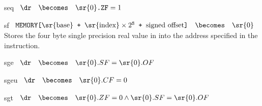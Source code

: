 \begin{instruction}{seq}
     {\seqopc}
     {
       \begin{math}
         \begin{array}{lcl}
           \dr & \becomes & \sr{0}\texttt{.ZF} = 1 \\
         \end{array}
       \end{math}
     }
\end{instruction}


\begin{instruction}{sf}
     {\sfopc}
     {
       \begin{math}
         \begin{array}{lcl}
           \texttt{MEMORY[\textrm{\sr{base}} + \(\textrm{\sr{index}}
               \times 2^\texttt{S}\) +  \textrm{signed offset}]}
           & \becomes & {\sr{0}}
         \end{array}
       \end{math}
     }
     {
       Stores the four byte single precision real value
       in  into the address specified in the instruction.
     }
\end{instruction}


\begin{instruction}{sge}
     {\sgeopc}
     {
       \begin{math}
         \begin{array}{lcl}
           \dr & \becomes & \sr{0}.SF = \sr{0}.OF \\
         \end{array}
       \end{math}
     }
\end{instruction}


\begin{instruction}{sgeu}
     {\sgeuopc}
     {
       \begin{math}
         \begin{array}{lcl}
           \dr & \becomes & \sr{0}.CF = 0 \\
         \end{array}
       \end{math}
     }
\end{instruction}


\begin{instruction}{sgt}
     {\sgtopc}
     {
       \begin{math}
         \begin{array}{lcl}
           \dr & \becomes & \sr{0}.ZF = 0 \wedge \sr{0}.SF = \sr{0}.OF \\
         \end{array}
       \end{math}
     }
\end{instruction}


